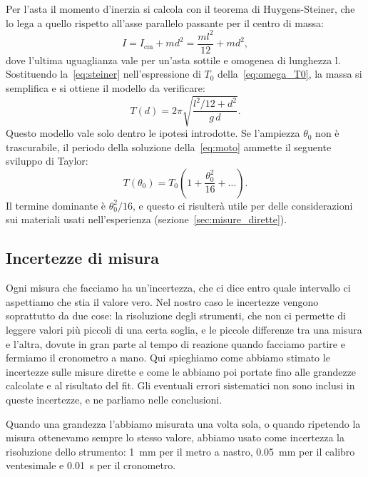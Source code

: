 \documentclass[a4paper]{article}
\begin{document}
Per l’asta il momento d’inerzia si calcola con il teorema di Huygens-Steiner, che lo lega a quello rispetto all’asse parallelo passante per il centro di massa:
\begin{equation}
    I = I_{\mathrm{cm}} + md^2 = \frac{ml^2}{12} + md^2,
    \label{eq:steiner}
\end{equation}
dove l’ultima uguaglianza vale per un’asta sottile e omogenea di lunghezza l. Sostituendo la~\eqref{eq:steiner} nell’espressione di $T_0$ della~\eqref{eq:omega_T0}, la massa si semplifica e si ottiene il modello da verificare:
\begin{equation}
    T(d) = 2\pi\sqrt{\frac{l^2/12 + d^2}{g\,d}} .
    \label{eq:periodo}
\end{equation}
Questo modello vale solo dentro le ipotesi introdotte. Se l’ampiezza $\theta_0$ non è trascurabile, il periodo della soluzione della~\eqref{eq:moto} ammette il seguente sviluppo di Taylor:
\begin{equation}
    T(\theta_0) = T_0\left(1 + \frac{\theta_0^2}{16} +  \dots\right).
    \label{eq:sviluppo_ampiezza}
\end{equation}
Il termine dominante è $\theta_0^2/16$, e questo ci risulterà utile per delle considerazioni sui materiali usati nell'esperienza (sezione~\ref{sec:misure_dirette}).
\subsection{Incertezze di misura}

Ogni misura che facciamo ha un'incertezza, che ci dice entro quale intervallo ci aspettiamo che stia il valore vero. Nel nostro caso le incertezze vengono soprattutto da due cose: la risoluzione degli strumenti, che non ci permette di leggere valori pi\`u piccoli di una certa soglia, e le piccole differenze tra una misura e l'altra, dovute in gran parte al tempo di reazione quando facciamo partire e fermiamo il cronometro a mano. Qui spieghiamo come abbiamo stimato le incertezze sulle misure dirette e come le abbiamo poi portate fino alle grandezze calcolate e al risultato del fit. Gli eventuali errori sistematici non sono inclusi in queste incertezze, e ne parliamo nelle conclusioni.

Quando una grandezza l'abbiamo misurata una volta sola, o quando ripetendo la misura ottenevamo sempre lo stesso valore, abbiamo usato come incertezza la risoluzione dello strumento: 1~mm per il metro a nastro, 0.05~mm per il calibro ventesimale e 0.01~s per il cronometro.
\end{document}
